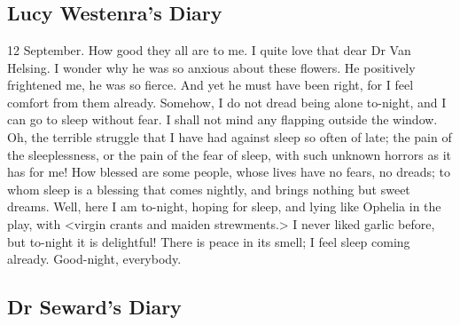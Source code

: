 \chapter[Chapter \thechapter]{}

\section{Lucy Westenra's Diary}

\begin{diary}{12 September.}
How good they all are to me. I quite love that dear Dr Van Helsing. I wonder why he was so anxious about these flowers. He positively frightened me, he was so fierce. And yet he must have been right, for I feel comfort from them already. Somehow, I do not dread being alone to-night, and I can go to sleep without fear. I shall not mind any flapping outside the window. Oh, the terrible struggle that I have had against sleep so often of late; the pain of the sleeplessness, or the pain of the fear of sleep, with such unknown horrors as it has for me! How blessed are some people, whose lives have no fears, no dreads; to whom sleep is a blessing that comes nightly, and brings nothing but sweet dreams. Well, here I am to-night, hoping for sleep, and lying like Ophelia in the play, with <virgin crants and maiden strewments.> I never liked garlic before, but to-night it is delightful! There is peace in its smell; I feel sleep coming already. Good-night, everybody.
\end{diary}

\section{Dr Seward's Diary}

